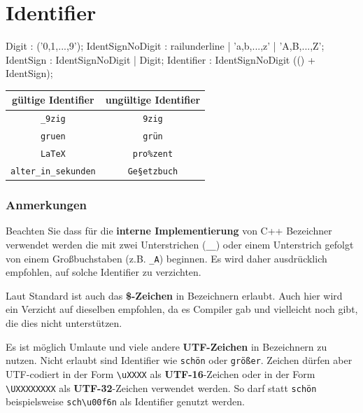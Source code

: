 \documentclass[a4paper]{report}
\begin{document}
\section{Identifier}


\begin{multicols}{2}
	\begin{rail}
		Digit : ('0,1,...,9');
		IdentSignNoDigit : railunderline | 'a,b,...,z' | 'A,B,...,Z';
		IdentSign : IdentSignNoDigit | Digit;
		Identifier : IdentSignNoDigit (() + IdentSign);
	\end{rail}
	\vspace{1ex}
	\begin{center}
		\begin{tabular}{|c|c|}
			\hline
			\textbf{gültige Identifier} & \textbf{ungültige Identifier} \\ \hline
			\texttt{\_9zig} & \texttt{9zig} \\
			\texttt{gruen} & \texttt{grün} \\
			\texttt{LaTeX} & \texttt{pro\%zent} \\
			\texttt{alter\_in\_sekunden} & \texttt{Ge\textrm{§}etzbuch} \\
			\hline
		\end{tabular}
	\end{center}
	
	\subsubsection{Anmerkungen}
	Beachten Sie dass für die \textbf{interne Implementierung} von C++ Bezeichner verwendet werden die mit zwei Unterstrichen (\texttt{\_\_}) oder einem Unterstrich gefolgt von einem Großbuchstaben (z.B. \texttt{\_A}) beginnen. Es wird daher ausdrücklich empfohlen, auf solche Identifier zu verzichten.
	
	Laut Standard ist auch das \textbf{\$-Zeichen} in Bezeichnern erlaubt. Auch hier wird ein Verzicht auf dieselben empfohlen, da es Compiler gab und vielleicht noch gibt, die dies nicht unterstützen.
	
	Es ist möglich Umlaute und viele andere \textbf{UTF-Zeichen} in Bezeichnern zu nutzen. Nicht erlaubt sind Identifier wie \texttt{schön} oder \texttt{größer}. Zeichen dürfen aber UTF-codiert in der Form \texttt{\textrm{\textbackslash}uXXXX} als \textbf{UTF-16}-Zeichen oder in der Form \texttt{\textrm{\textbackslash}UXXXXXXXX} als \textbf{UTF-32}-Zeichen verwendet werden. So darf statt \texttt{schön} beispielsweise \texttt{sch\textrm{\textbackslash}u00f6n} als Identifier genutzt werden.
\end{multicols}
\end{document}
